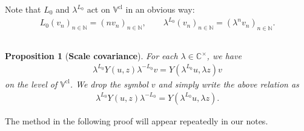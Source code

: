 \documentclass[11pt,b5paper,notitlepage]{article}
\theoremstyle{definition}
\theoremstyle{plain}
\newtheorem{pp}[df]{Proposition}
\newcommand{\Vbb}{\mathbb V}
\newcommand{\Cbb}{\mathbb C}
\newcommand{\Nbb}{\mathbb N}
\newcommand{\cl}{\mathrm{cl}}
\numberwithin{equation}{section}
\begin{document}
Note that $L_0$ and $\lambda^{L_0}$ act on $\Vbb^\cl$ in an  obvious way:
\begin{gather*}
L_0(v_n)_{n\in\Nbb}=(nv_n)_{n\in\Nbb},\qquad \lambda^{L_0}	(v_n)_{n\in\Nbb}=(\lambda^n v_n)_{n\in\Nbb}.
\end{gather*}




\subsection{}








\begin{pp}[\textbf{Scale covariance}]\label{lb63}
For each $\lambda\in\Cbb^\times$, we have
\begin{align}
\lambda^{L_0}Y(u,z)\lambda^{-L_0}v=Y(\lambda^{L_0}u,\lambda z)v\label{eq23}
\end{align}
on the level of $\Vbb^\cl$. We drop the symbol $v$ and simply write the above relation as
\begin{align*}
\lambda^{L_0}Y(u,z)\lambda^{-L_0}=Y(\lambda^{L_0}u,\lambda z).
\end{align*}
\end{pp}

The method in the following proof will appear repeatedly in our notes. 
\end{document}
